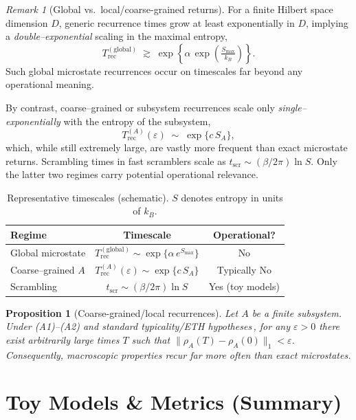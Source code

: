\documentclass[12pt]{article}
\newcommand{\Smax}{S_{\max}}
\newcommand{\TrecA}{T^{(A)}_{\text{rec}}}
\newcommand{\tscr}{t_{\text{scr}}}
\newtheorem{proposition}{Proposition}
\theoremstyle{remark}
\newtheorem{remark}{Remark}
\begin{document}
\begin{remark}[Global vs.\ local/coarse-grained returns]\label{rem:times}
For a finite Hilbert space dimension $D$, generic recurrence times grow at least 
exponentially in $D$, implying a \emph{double--exponential} scaling in the maximal entropy,
\[
T^{\mathrm{(global)}}_{\mathrm{rec}} \;\gtrsim\; \exp\!\left\{ \alpha\,\exp\!\left(\tfrac{S_{\max}}{k_B}\right)\right\}.
\]
Such global microstate recurrences occur on timescales far beyond any operational meaning.

By contrast, coarse--grained or subsystem recurrences scale only \emph{single--exponentially}
with the entropy of the subsystem,
\[
T^{(A)}_{\mathrm{rec}}(\varepsilon) \;\sim\; \exp\!\{c\,S_A\},
\]
which, while still extremely large, are vastly more frequent than exact microstate returns. 
Scrambling times in fast scramblers scale as $\tscr \sim (\beta/2\pi)\ln S$. 
Only the latter two regimes carry potential operational relevance.
\end{remark}


\begin{table}[t]
\centering
\caption{Representative timescales (schematic). $S$ denotes entropy in units of $k_B$.}
\begin{tabular}{lcc}
\toprule
Regime & Timescale & Operational? \\
\midrule
Global microstate & $\displaystyle T^{\mathrm{(global)}}_{\text{rec}}\sim \exp\{\alpha\,e^{\Smax}\}$ & No \\
Coarse–grained $A$ & $\displaystyle \TrecA(\varepsilon)\sim \exp\{c\,S_A\}$ & Typically No \\
Scrambling & $\displaystyle \tscr\sim (\beta/2\pi)\ln S$ & Yes (toy models) \\
\bottomrule
\end{tabular}
\label{tab:times}
\end{table}


\begin{proposition}[Coarse-grained/local recurrences]\label{prop:coarse}
Let $A$ be a finite subsystem. Under (A1)--(A2) and standard typicality/ETH hypotheses\,\cite{GoldsteinEtAl2006,Deutsch1991}, for any $\varepsilon>0$ there exist arbitrarily large times $T$ such that $\lVert\rho_A(T)-\rho_A(0)\rVert_1<\varepsilon$. Consequently, macroscopic properties recur far more often than exact microstates.
\end{proposition}


\section{Toy Models \& Metrics (Summary)}
\label{sec:toymodels}
\end{document}
